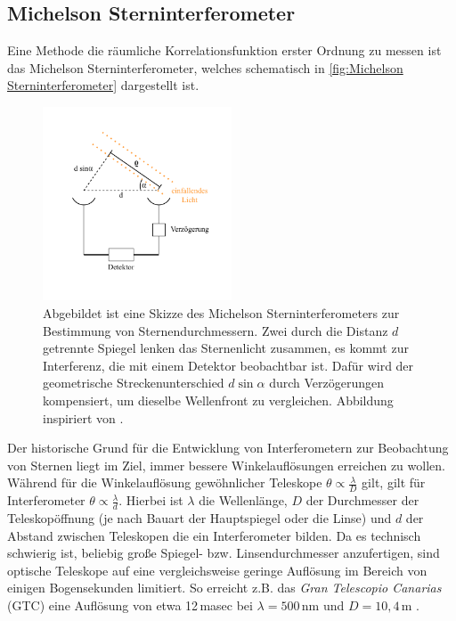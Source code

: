 \subsection{Michelson Sterninterferometer}
\label{ssec:Michelson Sterninterferometer}
Eine Methode die räumliche Korrelationsfunktion erster Ordnung zu messen ist das Michelson Sterninterferometer, welches schematisch in \autoref{fig:Michelson Sterninterferometer} dargestellt ist. 
\begin{figure}[htbp]
    \centering
    \includegraphics[width=0.5\textwidth]{images/Theorie/Michelson_Interferometer.pdf}
    \caption{Abgebildet ist eine Skizze des Michelson Sterninterferometers zur Bestimmung von Sternendurchmessern. Zwei durch die Distanz $d$ getrennte Spiegel lenken das Sternenlicht zusammen, es kommt zur Interferenz, die mit einem Detektor beobachtbar ist. Dafür wird der geometrische Streckenunterschied $d\sin\alpha$ durch Verzögerungen kompensiert, um dieselbe Wellenfront zu vergleichen. Abbildung inspiriert von \cite[Fig. 1]{foellmiIntensityInterferometrySecondorder2009}.}
    \label{fig:Michelson Sterninterferometer}
\end{figure}
Der historische Grund für die Entwicklung von Interferometern zur Beobachtung von Sternen liegt im Ziel, immer bessere Winkelauflösungen erreichen zu wollen. 
Während für die Winkelauflösung gewöhnlicher Teleskope $\theta \propto \frac{\lambda}{D}$ gilt, gilt für Interferometer $\theta \propto \frac{\lambda}{d}$. 
Hierbei ist $\lambda$ die Wellenlänge, $D$ der Durchmesser der Teleskopöffnung (je nach Bauart der Hauptspiegel oder die Linse) und $d$ der Abstand zwischen Teleskopen die ein Interferometer bilden. 
Da es technisch schwierig ist, beliebig große Spiegel- bzw. Linsendurchmesser anzufertigen, sind optische Teleskope auf eine vergleichsweise geringe Auflösung im Bereich von einigen Bogensekunden limitiert. 
So erreicht z.B. das \emph{Gran Telescopio Canarias} (GTC) eine Auflösung von etwa 12\,masec bei $\lambda=500\,\mathrm{nm}$ und $D=10,4\,\mathrm{m}$ \cite{GranTelescopioCANARIAS}. 
